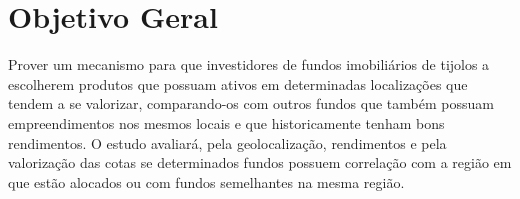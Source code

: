 \section{Objetivo Geral}

Prover um mecanismo para que investidores de fundos imobiliários de tijolos a escolherem produtos que possuam ativos em determinadas localizações que tendem a se valorizar, comparando-os com outros fundos que também possuam empreendimentos nos mesmos locais e que historicamente tenham bons rendimentos. 
O estudo avaliará, pela geolocalização, rendimentos e pela valorização das cotas se determinados fundos possuem correlação com a região em que estão alocados ou com fundos semelhantes na mesma região.
